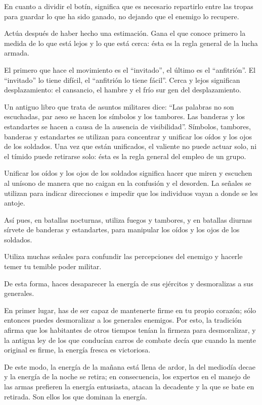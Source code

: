 En cuanto a dividir el botín, significa que es necesario repartirlo entre las tropas para guardar lo que ha sido ganado, no dejando que el enemigo lo recupere.

Actúa después de haber hecho una estimación. Gana el que conoce primero la medida de lo que está lejos y lo que está cerca: ésta es la regla general de la lucha armada.

El primero que hace el movimiento es el ``invitado'', el último es el ``anfitrión''. El ``invitado'' lo tiene difícil, el ``anfitrión lo tiene fácil''. Cerca y lejos significan desplazamiento: el cansancio, el hambre y el frío sur gen del desplazamiento.

Un antiguo libro que trata de asuntos militares dice: ``Las palabras no son escuchadas, par aeso se hacen los símbolos y los tambores. Las banderas y los estandartes se hacen a causa de la ausencia de visibilidad''. Símbolos, tambores, banderas y estandartes se utilizan para concentrar y unificar los oídos y los ojos de los soldados. Una vez que están unificados, el valiente no puede actuar solo, ni el tímido puede retirarse solo: ésta es la regla general del empleo de un grupo.

Unificar los oídos y los ojos de los soldados significa hacer que miren y escuchen al unísono de manera que no caigan en la confusión y el desorden. La señales se utilizan para indicar direcciones e impedir que los individuos vayan a donde se les antoje.

Así pues, en batallas nocturnas, utiliza fuegos y tambores, y en batallas diurnas sírvete de banderas y estandartes, para manipular los oídos y los ojos de los soldados.

Utiliza muchas señales para confundir las percepciones del enemigo y hacerle temer tu temible poder militar.

De esta forma, haces desaparecer la energía de sus ejércitos y desmoralizas a sus generales.

En primer lugar, has de ser capaz de mantenerte firme en tu propio corazón; sólo entonces puedes desmoralizar a los generales enemigos. Por esto, la tradición afirma que los habitantes de otros tiempos tenían la firmeza para desmoralizar, y la antigua ley de los que conducían carros de combate decía que cuando la mente original es firme, la energía fresca es victoriosa.

De este modo, la energía de la mañana está llena de ardor, la del mediodía decae y la energía de la noche se retira; en consecuencia, los expertos en el manejo de las armas prefieren la energía entusiasta, atacan la decadente y la que se bate en retirada. Son ellos los que dominan la energía.


